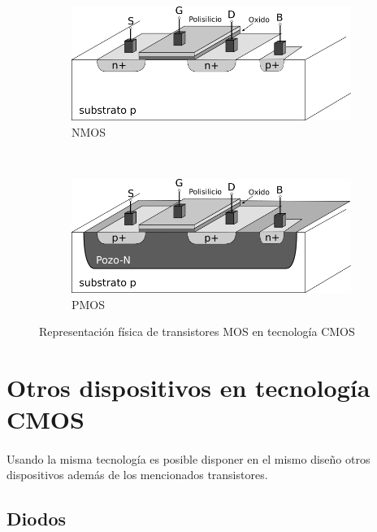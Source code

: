 \begin{figure}
	\centering
	\begin{subfigure}[b]{0.45\textwidth}
		\includegraphics[width=\textwidth]{img/nmos.png}
		\caption{NMOS}
		\label{fig:nmos}
	\end{subfigure}
	~ %
	\begin{subfigure}[b]{0.45\textwidth}
		\includegraphics[width=\textwidth]{img/pmos.png}
		\caption{PMOS}
		\label{fig:pmos}
	\end{subfigure}
	\caption{Representación física de transistores MOS en tecnología CMOS}
	\label{fig:cmos_transistors}
\end{figure}

\section{Otros dispositivos en tecnología CMOS}\label{cap:otros_dispositivos}

\paragraph{}
Usando la misma tecnología es posible disponer en el mismo diseño otros dispositivos
además de los mencionados transistores.

\subsection{Diodos}\label{cap:diodos}
